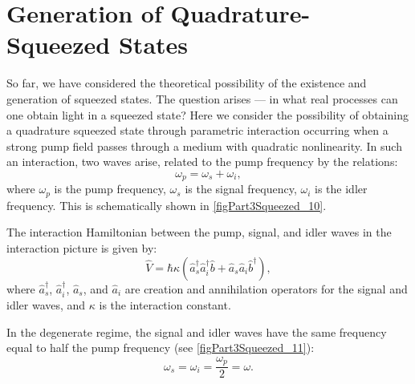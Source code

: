 \section{Generation of Quadrature-Squeezed States}
\label{pNonClassGenerSqueezed}
So far, we have considered the theoretical possibility of the existence and
generation of squeezed states. The question arises — in what real
processes can one obtain light in a squeezed state? Here we consider
the possibility of obtaining a quadrature squeezed state through
parametric interaction occurring when a strong
pump field passes through a medium with quadratic nonlinearity. In such
an interaction, two waves arise, related to the pump frequency by the relations:
\begin{equation}
\omega_p = \omega_s + \omega_i,
\nonumber
\end{equation}
where $\omega_p$ is the pump frequency, $\omega_s$ is the signal frequency,
$\omega_i$ is the idler frequency. This is schematically shown in 
\autoref{figPart3Squeezed_10}.




The interaction Hamiltonian between the pump, signal, and idler
waves in the interaction picture is given by:
\begin{equation}
\hat{V} = \hbar \kappa \left(
\hat{a}^{\dag}_s \hat{a}^{\dag}_i \hat{b} + 
\hat{a}_s \hat{a}_i \hat{b}^{\dag}
\right),
\label{eqPart3Squeezed30}
\end{equation}
where $\hat{a}^{\dag}_s$, $\hat{a}^{\dag}_i$, 
$\hat{a}_s$, and $\hat{a}_i$ are creation and annihilation operators for
the signal and idler waves, and $\kappa$ is the interaction constant.



In the degenerate regime, the signal and idler waves have the same
frequency equal to half the pump frequency (see \autoref{figPart3Squeezed_11}):
\[
\omega_s = \omega_i = \frac{\omega_p}{2} = \omega.
\]

